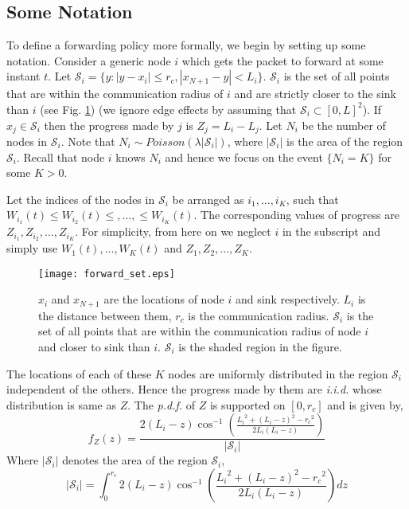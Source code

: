 \documentclass[onecolumn]{IEEEtran}
\begin{document}
\subsection{Some Notation}
\label{notation_sec}
To define a forwarding policy more formally, we begin by setting up
some notation. Consider a generic node $i$ which gets the packet to
forward at some instant $t$. Let $\mathcal{S}_i=\{y:|y-x_i|\le r_c,
|x_{N+1}-y|<L_i\}$.  $\mathcal{S}_i$ is the set of all points that are
within the communication radius of $i$ and are strictly closer to the
sink than $i$ (see Fig. \ref{forwardset_figu}) (we ignore edge effects
by assuming that $\mathcal{S}_i\subset[0,L]^2$).  If
$x_j\in\mathcal{S}_i$ then the progress made by $j$ is $Z_j=L_i-L_j$.
Let $N_i$ be the number of nodes in $\mathcal{S}_i$. Note that
$N_i\sim Poisson(\lambda |\mathcal{S}_i|)$, where $|\mathcal{S}_i|$ is
the area of the region $\mathcal{S}_i$. Recall that node $i$ knows
$N_i$ and hence we focus on the event $\{N_i=K\}$ for some $K>0$.

Let the indices of the nodes in $\mathcal{S}_i$ be arranged as
$i_1,...,i_{K}$, such that $W_{i_1}(t)\le W_{i_2}(t)\le,...,\le
W_{i_{K}}(t)$.  The corresponding values of progress are
$Z_{i_1},Z_{i_2},...,Z_{i_{K}}$. For simplicity, from here on we
neglect $i$ in the subscript and simply use $W_{1}(t),...,W_{{K}}(t)$
and $Z_{1},Z_{2},...,Z_{{K}}$.
\begin{figure}[ht]
\centering
\texttt{[image: forward\_set.eps]}
\caption{$x_i$ and $x_{N+1}$ are the locations of node $i$ and sink
  respectively. $L_i$ is the distance between them, $r_c$ is the
  communication radius.  $\mathcal{S}_i$ is the set of all points that
  are within the communication radius of node $i$ and closer to sink
  than $i$. $\mathcal{S}_i$ is the shaded region in the figure.
  \label{forwardset_figu}}
\end{figure}

The locations of each of these $K$ nodes are uniformly distributed in
the region $\mathcal{S}_i$ independent of the others. Hence the
progress made by them are \emph{i.i.d.} whose distribution is same as $Z$.
The \emph{p.d.f.} of $Z$ is supported on $[0,r_c]$ and is given by,
\begin{equation}
\label{distribution_equn}
f_{Z}(z)=\frac{2(L_i-z)\cos^{-1}\left(\frac{{L_i}^2+{(L_i-z)}^2-{r_c}^2}{2L_i(L_i-z)}\right)}{|\mathcal{S}_i|}
\end{equation}
Where $|\mathcal{S}_i|$ denotes the area of the region $\mathcal{S}_i$, 
\begin{equation}
\label{area_equn}
|\mathcal{S}_i|=\int_0^{r_c}{2(L_i-z)\cos^{-1}\left(\frac{{L_i}^2+{(L_i-z)}^2-{r_c}^2}{2L_i(L_i-z)}\right)}dz
\end{equation}
\end{document}
